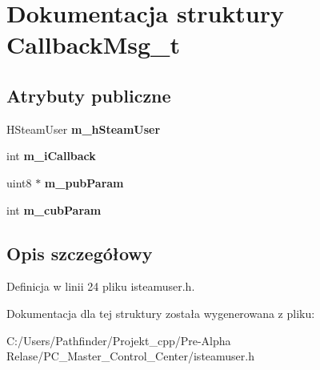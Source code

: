 \hypertarget{struct_callback_msg__t}{}\section{Dokumentacja struktury Callback\+Msg\+\_\+t}
\label{struct_callback_msg__t}
\subsection*{Atrybuty publiczne}
\begin{DoxyCompactItemize}
\item 
\mbox{\label{struct_callback_msg__t_ab0b8148265fb6a3ee2ed91b0c1201af5}} 
H\+Steam\+User {\bfseries m\+\_\+h\+Steam\+User}
\item 
\mbox{\label{struct_callback_msg__t_a5504d33c9e201ac4755e86b0ed8150d7}} 
int {\bfseries m\+\_\+i\+Callback}
\item 
\mbox{\label{struct_callback_msg__t_a032b658e0d5020c2e66ba8143e8277f5}} 
uint8 $\ast$ {\bfseries m\+\_\+pub\+Param}
\item 
\mbox{\label{struct_callback_msg__t_a82532812531e06f166e38cc0024a74ff}} 
int {\bfseries m\+\_\+cub\+Param}
\end{DoxyCompactItemize}


\subsection{Opis szczegółowy}


Definicja w linii 24 pliku isteamuser.\+h.



Dokumentacja dla tej struktury została wygenerowana z pliku\+:\begin{DoxyCompactItemize}
\item 
C\+:/\+Users/\+Pathfinder/\+Projekt\+\_\+cpp/\+Pre-\/\+Alpha Relase/\+P\+C\+\_\+\+Master\+\_\+\+Control\+\_\+\+Center/isteamuser.\+h\end{DoxyCompactItemize}
